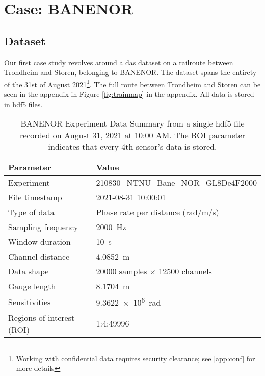 \section{Case: BANENOR}

\subsection{Dataset}

Our first case study revolves around a \acrshort{das} dataset on a railroute between Trondheim and Storen, belonging to BANENOR. The dataset spans the entirety of the 31st of August 2021\footnote{Working with confidential data requires security clearance; see \ref{app:conf} for more details}. The full route between Trondheim and Storen can be seen in the appendix in Figure \ref{fig:trainmap} in the appendix. All data is stored in \acrshort{hdf5} files.

\begin{table}[!h]
    \centering
    \small
    \begin{tabular}{@{}p{}p{}@{}}
        \toprule
        \textbf{Parameter} & \textbf{Value} \\
        \midrule
        Experiment & 210830\_NTNU\_Bane\_NOR\_GL8De4F2000  \\
        File timestamp & 2021-08-31 10:00:01  \\
        Type of data & Phase rate per distance (rad/m/s) \\
        Sampling frequency & \qty{2000}{\hertz} \\
        Window duration & \qty{10}{\second} \\
        Channel distance & \qty{4.0852}{\meter} \\
        \midrule
        Data shape & 20000 samples \(\times\) 12500 channels  \\
        \midrule
        Gauge length & \qty{8.1704}{\meter} \\
        Sensitivities & \qty{9.3622e6}{\radian} \\
        Regions of interest (ROI) & 1:4:49996 \\
        \bottomrule
    \end{tabular}
    \caption{BANENOR Experiment Data Summary from a single \acrshort{hdf5} file recorded on August 31, 2021 at 10:00 AM. The ROI parameter indicates that every 4th sensor's data is stored.}
    \label{tab:experiment_data}
\end{table}


